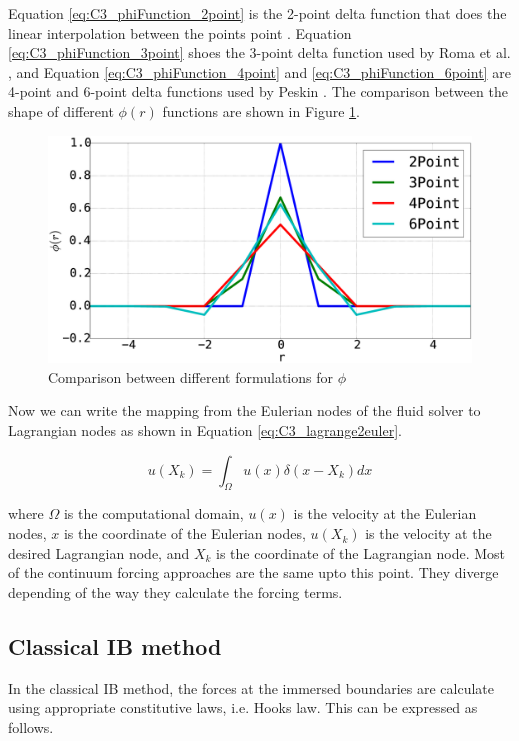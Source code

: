 Equation \eqref{eq:C3_phiFunction_2point} is the 2-point delta function that does the linear interpolation between the points point \cite{saiki1996numerical}. Equation \eqref{eq:C3_phiFunction_3point} shoes the 3-point delta function used by Roma et al. \cite{roma1999adaptive}, and Equation \eqref{eq:C3_phiFunction_4point} and \eqref{eq:C3_phiFunction_6point} are 4-point and 6-point delta functions used by Peskin \cite{peskin2002immersed}. The comparison between the shape of different $\phi(r)$ functions are shown in Figure \ref{fig:C3_phi_function}.

\begin{figure}[H]
	\centering
	\includegraphics[width=14.cm]{Chapter_3/figure/phi_function.eps}
	\caption{Comparison between different formulations for $\phi$}
	\label{fig:C3_phi_function}
\end{figure}

Now we can write the mapping from the Eulerian nodes of the fluid solver to Lagrangian nodes as shown in Equation \eqref{eq:C3_lagrange2euler}.

\begin{equation}\label{eq:C3_lagrange2euler}
	u(X_k) = \int_\Omega u(x) \delta(x - X_k) dx
\end{equation}

where $\Omega$ is the computational domain, $u(x)$ is the velocity at the Eulerian nodes, $x$ is the coordinate of the Eulerian nodes, $u(X_k)$ is the velocity at the desired Lagrangian node, and $X_k$ is the coordinate of the Lagrangian node. Most of the continuum forcing approaches are the same upto this point. They diverge depending of the way they calculate the forcing terms.

\subsection{Classical IB method}
In the classical IB method, the forces at the immersed boundaries are calculate using appropriate constitutive laws, i.e. Hooks law. This can be expressed as follows.

